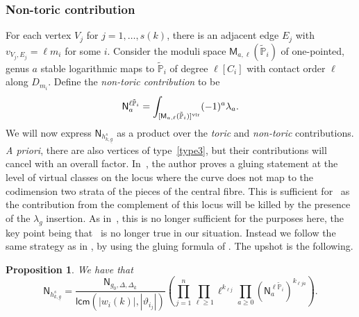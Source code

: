 \documentclass[11pt]{amsart}
\numberwithin{equation}{section}
\theoremstyle{plain}
\newtheorem{proposition}[theorem]{Proposition}
\theoremstyle{remark}
\theoremstyle{definition}
\newcommand{\PP}{\mathbb{P}}
\newcommand{\vir}{\text{\rm vir}}
\begin{document}
\subsubsection{Non-toric contribution}
For each vertex $V_j$ for $j=1,\dots,s(k)$, there is an adjacent edge $E_j$ with $v_{V_j,E_j} = \ell m_i$ for some $i$. Consider the moduli space $\mathsf{M}_{a,\ell}(\tilde{\PP}_i)$  of one-pointed, genus $a$ stable logarithmic maps to $\tilde{\PP}_i$ of degree $\ell[C_i]$ with contact order $\ell$ along $D_{m_i}$. Define the \emph{non-toric contribution} to be
$$\mathsf{N}_{a}^{\ell \tilde{\PP}_i} = \int_{[\mathsf{M}_{a,\ell}(\tilde{\PP}_i)]^{\vir}}(-1)^a \lambda_{a}.$$
We will now express $\mathsf{N}_{h_{k,\underline{g}}^s}$ as a product over the \emph{toric} and \emph{non-toric} contributions. \textit{A priori}, there are also vertices of type~\eqref{type3}, but their contributions will cancel with an overall factor. In~\cite[Section 5.5]{bousseau2020quantumtrop}, the author proves a gluing statement at the level of virtual classes on the locus where the curve does not map to the codimension two strata of the pieces of the central fibre. This is sufficient for~\cite[Proposition 5.6]{bousseau2020quantumtrop} as the contribution from the complement of this locus will be killed by the presence of the $\lambda_g$ insertion. As in~\cite[Section 3.4]{kennedyhunt2023tropical}, this is no longer sufficient for the purposes here, the key point being that~\cite[Lemma 5.7]{bousseau2020quantumtrop} is no longer true in our situation. Instead we follow the same strategy as in \cite[Section~3.4]{kennedyhunt2023tropical}, by using the gluing formula of \cite{ranganthan2022logarithmic}. The upshot is the following.

\begin{proposition}\label{Proposition : gluing}
  We have that
    $$\mathsf{N}_{h_{k,\underline{g}}^s} = \frac{\mathsf{N}_{g_0,\Delta, \Delta_k}}{\mathsf{lcm}\left(|w_i(k)|,\left|\vartheta_{i_j}\right|\right)}\left(\prod_{j=1}^n \prod_{\ell \geq 1} \ell^{k_{\ell j}}\prod_{a \geq 0} \left(\mathsf{N}^{\ell \tilde{\PP}_i}_{a}\right)^{k_{\ell j a}}\right).$$
\end{proposition}
\end{document}
